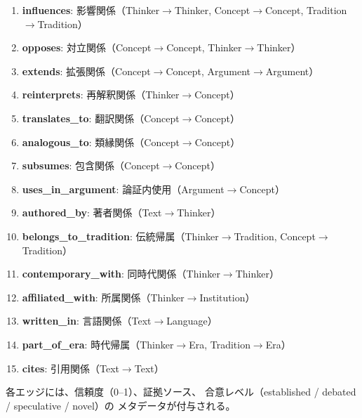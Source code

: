\documentclass[a4paper,11pt]{ltjsarticle}
\begin{document}
\begin{enumerate}[leftmargin=2em]
  \item \textbf{influences}: 影響関係（Thinker$\to$Thinker, Concept$\to$Concept, Tradition$\to$Tradition）
  \item \textbf{opposes}: 対立関係（Concept$\to$Concept, Thinker$\to$Thinker）
  \item \textbf{extends}: 拡張関係（Concept$\to$Concept, Argument$\to$Argument）
  \item \textbf{reinterprets}: 再解釈関係（Thinker$\to$Concept）
  \item \textbf{translates\_to}: 翻訳関係（Concept$\to$Concept）
  \item \textbf{analogous\_to}: 類縁関係（Concept$\to$Concept）
  \item \textbf{subsumes}: 包含関係（Concept$\to$Concept）
  \item \textbf{uses\_in\_argument}: 論証内使用（Argument$\to$Concept）
  \item \textbf{authored\_by}: 著者関係（Text$\to$Thinker）
  \item \textbf{belongs\_to\_tradition}: 伝統帰属（Thinker$\to$Tradition, Concept$\to$Tradition）
  \item \textbf{contemporary\_with}: 同時代関係（Thinker$\to$Thinker）
  \item \textbf{affiliated\_with}: 所属関係（Thinker$\to$Institution）
  \item \textbf{written\_in}: 言語関係（Text$\to$Language）
  \item \textbf{part\_of\_era}: 時代帰属（Thinker$\to$Era, Tradition$\to$Era）
  \item \textbf{cites}: 引用関係（Text$\to$Text）
\end{enumerate}

各エッジには、信頼度（0--1）、証拠ソース、
合意レベル（established / debated / speculative / novel）の
メタデータが付与される。
\end{document}
